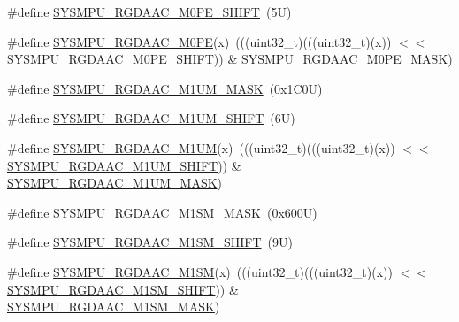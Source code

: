 \begin{DoxyCompactItemize}
\item 
\#define \mbox{\hyperlink{group___s_y_s_m_p_u___register___masks_gae35ce9172c62d386a9042e30dbd74863}{S\+Y\+S\+M\+P\+U\+\_\+\+R\+G\+D\+A\+A\+C\+\_\+\+M0\+P\+E\+\_\+\+S\+H\+I\+FT}}~(5\+U)
\item 
\#define \mbox{\hyperlink{group___s_y_s_m_p_u___register___masks_ga7ed41b53162a22c4a3d3dbc093c56a28}{S\+Y\+S\+M\+P\+U\+\_\+\+R\+G\+D\+A\+A\+C\+\_\+\+M0\+PE}}(x)~(((uint32\+\_\+t)(((uint32\+\_\+t)(x)) $<$$<$ \mbox{\hyperlink{group___s_y_s_m_p_u___register___masks_gae35ce9172c62d386a9042e30dbd74863}{S\+Y\+S\+M\+P\+U\+\_\+\+R\+G\+D\+A\+A\+C\+\_\+\+M0\+P\+E\+\_\+\+S\+H\+I\+FT}})) \& \mbox{\hyperlink{group___s_y_s_m_p_u___register___masks_ga93284d1a0a0c34dad8a07e15fa24041a}{S\+Y\+S\+M\+P\+U\+\_\+\+R\+G\+D\+A\+A\+C\+\_\+\+M0\+P\+E\+\_\+\+M\+A\+SK}})
\item 
\#define \mbox{\hyperlink{group___s_y_s_m_p_u___register___masks_gaee03b4db0fc2c4b8a1bfca463bc12080}{S\+Y\+S\+M\+P\+U\+\_\+\+R\+G\+D\+A\+A\+C\+\_\+\+M1\+U\+M\+\_\+\+M\+A\+SK}}~(0x1\+C0\+U)
\item 
\#define \mbox{\hyperlink{group___s_y_s_m_p_u___register___masks_gaac07a4c547a0f649e468d7a718940328}{S\+Y\+S\+M\+P\+U\+\_\+\+R\+G\+D\+A\+A\+C\+\_\+\+M1\+U\+M\+\_\+\+S\+H\+I\+FT}}~(6\+U)
\item 
\#define \mbox{\hyperlink{group___s_y_s_m_p_u___register___masks_ga9dfcefb65fe3682a21c0534523d5bfae}{S\+Y\+S\+M\+P\+U\+\_\+\+R\+G\+D\+A\+A\+C\+\_\+\+M1\+UM}}(x)~(((uint32\+\_\+t)(((uint32\+\_\+t)(x)) $<$$<$ \mbox{\hyperlink{group___s_y_s_m_p_u___register___masks_gaac07a4c547a0f649e468d7a718940328}{S\+Y\+S\+M\+P\+U\+\_\+\+R\+G\+D\+A\+A\+C\+\_\+\+M1\+U\+M\+\_\+\+S\+H\+I\+FT}})) \& \mbox{\hyperlink{group___s_y_s_m_p_u___register___masks_gaee03b4db0fc2c4b8a1bfca463bc12080}{S\+Y\+S\+M\+P\+U\+\_\+\+R\+G\+D\+A\+A\+C\+\_\+\+M1\+U\+M\+\_\+\+M\+A\+SK}})
\item 
\#define \mbox{\hyperlink{group___s_y_s_m_p_u___register___masks_gacedbd4cbc18414a2fb369562eba67ad9}{S\+Y\+S\+M\+P\+U\+\_\+\+R\+G\+D\+A\+A\+C\+\_\+\+M1\+S\+M\+\_\+\+M\+A\+SK}}~(0x600\+U)
\item 
\#define \mbox{\hyperlink{group___s_y_s_m_p_u___register___masks_ga64bb3f490d3eb5ae8ffc915d930ac329}{S\+Y\+S\+M\+P\+U\+\_\+\+R\+G\+D\+A\+A\+C\+\_\+\+M1\+S\+M\+\_\+\+S\+H\+I\+FT}}~(9\+U)
\item 
\#define \mbox{\hyperlink{group___s_y_s_m_p_u___register___masks_ga6e329f68f5285da783af4411f7726277}{S\+Y\+S\+M\+P\+U\+\_\+\+R\+G\+D\+A\+A\+C\+\_\+\+M1\+SM}}(x)~(((uint32\+\_\+t)(((uint32\+\_\+t)(x)) $<$$<$ \mbox{\hyperlink{group___s_y_s_m_p_u___register___masks_ga64bb3f490d3eb5ae8ffc915d930ac329}{S\+Y\+S\+M\+P\+U\+\_\+\+R\+G\+D\+A\+A\+C\+\_\+\+M1\+S\+M\+\_\+\+S\+H\+I\+FT}})) \& \mbox{\hyperlink{group___s_y_s_m_p_u___register___masks_gacedbd4cbc18414a2fb369562eba67ad9}{S\+Y\+S\+M\+P\+U\+\_\+\+R\+G\+D\+A\+A\+C\+\_\+\+M1\+S\+M\+\_\+\+M\+A\+SK}})
$$
\end{DoxyCompactItemize}
